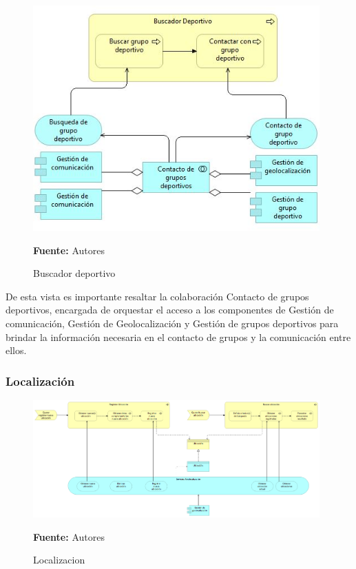 \begin{figure}[!htb]
  \begin{center}
    \includegraphics[width=11cm]{./imagenes/Archimate/vistas/application_usage/buscadordeportivo.png}
    \caption{Buscador deportivo}
    \label{fig:BP_BuscadorDeportivo}
    \textbf{Fuente:}  Autores
  \end{center}
\end{figure}

De esta vista es importante resaltar la colaboración Contacto de grupos deportivos, encargada de orquestar el acceso a los componentes de Gestión de comunicación, Gestión de Geolocalización y Gestión de grupos deportivos para brindar la información necesaria en el contacto de grupos y la comunicación entre ellos.

\subsubsection{Localización}

\begin{figure}[!htb]
  \begin{center}
    \includegraphics[width=11cm]{./imagenes/Archimate/vistas/application_usage/localizacion.png}
    \caption{Localizacion}
    \label{fig:BP_localizacion}
    \textbf{Fuente:}  Autores
  \end{center}
\end{figure}

